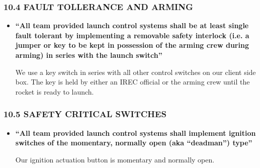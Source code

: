 \documentclass[letter]{article}
\begin{document}
\subsubsection{10.4 FAULT TOLLERANCE AND ARMING}
\begin{itemize}
\item {\bfseries ``All team provided launch control systems shall be at least single fault tolerant by implementing a removable safety
interlock (i.e. a jumper or key to be kept in possession of the arming crew during arming) in series with the launch
switch''}

We use a key switch in series with all other control switches on our client
side box. The key is held by either an IREC official or the arming crew until
the rocket is ready to launch.
\end{itemize}
\subsubsection{10.5 SAFETY CRITICAL SWITCHES}
\begin{itemize}
\item {\bfseries ``All team provided launch control systems shall implement ignition switches of the momentary, normally open (aka
``deadman'') type''}

Our ignition actuation button is momentary and normally open.
\end{itemize}
\end{document}
